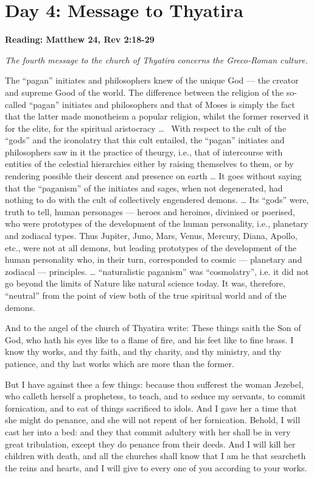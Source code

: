 \section{Day 4: Message to Thyatira}

\textbf{Reading: Matthew 24, Rev 2:18-29}

\emph{The fourth message to the church of Thyatira concerns the Greco-Roman culture.}

\begin{quotex}
The ``pagan'' initiates and philosophers knew of the unique God — the creator and supreme Good of the world. The difference between the religion of the so-called ``pagan'' initiates and philosophers and that of Moses is simply the fact that the latter made monotheism a popular religion, whilst the former reserved it for the elite, for the spiritual aristocracy …  With respect to the cult of the ``gods'' and the iconolatry that this cult entailed, the ``pagan'' initiates and philosophers saw in it the practice of theurgy, i.e., that of intercourse with entities of the celestial hierarchies either by raising themselves to them, or by rendering possible their descent and presence on earth … It goes without saying that the ``paganism'' of the initiates and sages, when not degenerated, had nothing to do with the cult of collectively engendered demons. … Its ``gods'' were, truth to tell, human personages — heroes and heroines, divinised or poerised, who were prototypes of the development of the human personality, i.e., planetary and zodiacal types. Thus Jupiter, Juno, Mars, Venus, Mercury, Diana, Apollo, etc., were not at all demons, but leading prototypes of the development of the human personality who, in their turn, corresponded to cosmic — planetary and zodiacal — principles. … ``naturalistic paganism'' was ``cosmolatry'', i.e. it did not go beyond the limits of Nature like natural science today. It was, therefore, ``neutral'' from the point of view both of the true spiritual world and of the demons. 

\end{quotex}

And to the angel of the church of Thyatira write: These things saith the Son of God, who hath his eyes like to a flame of fire, and his feet like to fine brass. I know thy works, and thy faith, and thy charity, and thy ministry, and thy patience, and thy last works which are more than the former.

But I have against thee a few things: because thou sufferest the woman Jezebel, who calleth herself a prophetess, to teach, and to seduce my servants, to commit fornication, and to eat of things sacrificed to idols. And I gave her a time that she might do penance, and she will not repent of her fornication. Behold, I will cast her into a bed: and they that commit adultery with her shall be in very great tribulation, except they do penance from their deeds. And I will kill her children with death, and all the churches shall know that I am he that searcheth the reins and hearts, and I will give to every one of you according to your works.

